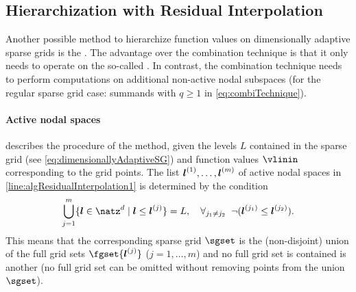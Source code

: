 \subsection{Hierarchization with Residual Interpolation}
\label{sec:433residualInterpolation}

Another possible method to hierarchize function values on
dimensionally adaptive sparse grids is the
.
The advantage over the combination technique is that
it only needs to operate on the so-called .
In contrast, the combination technique needs to perform computations
on additional non-active nodal subspaces
(for the regular sparse grid case:
summands with $q \ge 1$ in \eqref{eq:combiTechnique}).

\paragraph{Active nodal spaces}

 describes the procedure of the method,
given the levels $L$ contained in the sparse grid
(see \eqref{eq:dimensionallyAdaptiveSG})
and function values $\vlinin$ corresponding to the grid points.
The list ${\boldsymbol{l}}^{(1)}, \dotsc, {\boldsymbol{l}}^{(m)}$ of active nodal spaces
in \cref{line:algResidualInterpolation1} is determined by the condition
\begin{equation}
  \bigcup_{j=1}^m \{\*l \in \natz^d \mid \*l \le \*l^{(j)}\} = L,\quad
  \falarge{j_1 \not= j_2}{\lnot(\*l^{(j_1)} \le \*l^{(j_2)})}.
\end{equation}
This means that the corresponding sparse grid $\sgset$
is the (non-disjoint) union of the full grid sets $\fgset{\*l^{(j)}}$
($j = 1, \dotsc, m$)
and no full grid set is contained is another
(no full grid set can be omitted without
removing points from the union $\sgset$).

